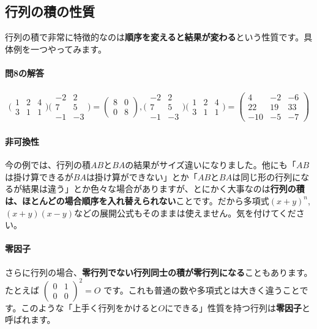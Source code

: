 \subsection{行列の積の性質}
行列の積で非常に特徴的なのは\textbf{順序を変えると結果が変わる}という性質です。具体例を一つやってみます。

\paragraph{問8の解答}
\begin{align*}
\biggl(
\begin{array}{ccc}
1 & 2 & 4 \\ \hline
3 & 1 & 1
\end{array}
\biggr)
\Biggl(
\begin{array}{c|c}
-2 & 2 \\
7 & 5 \\
-1 & -3
\end{array}
\Biggr)
=
\begin{pmatrix}
8 & 0 \\
0 & 8
\end{pmatrix}, 
\Biggl(
\begin{array}{cc}
-2 & 2 \\ \hline
7 & 5 \\ \hline
-1 & -3
\end{array}
\Biggr)
\biggl(
\begin{array}{c|c|c}
1 & 2 & 4 \\
3 & 1 & 1
\end{array}
\biggr)
=
\begin{pmatrix}
4 & -2 & -6 \\
22 & 19 & 33 \\
-10 & -5 & -7
\end{pmatrix}
\end{align*}

\paragraph{非可換性}

今の例では、行列の積$AB$と$BA$の結果がサイズ違いになりました。他にも「$AB$は掛け算できるが$BA$は掛け算ができない」とか「$AB$と$BA$は同じ形の行列になるが結果は違う」とか色々な場合がありますが、とにかく大事なのは\textbf{行列の積は、ほとんどの場合順序を入れ替えられない}ことです。だから多項式$(x+y)^n$, $(x+y)(x-y)$などの展開公式もそのままは使えません。気を付けてください。

\paragraph{零因子}
さらに行列の場合、\textbf{零行列でない行列同士の積が零行列になる}こともあります。たとえば
$\begin{pmatrix}
0 & 1 \\
0 & 0 
\end{pmatrix}^2 = O$
です。これも普通の数や多項式とは大きく違うことです。このような「上手く行列をかけると$O$にできる」性質を持つ行列は\textbf{零因子}と呼ばれます。

